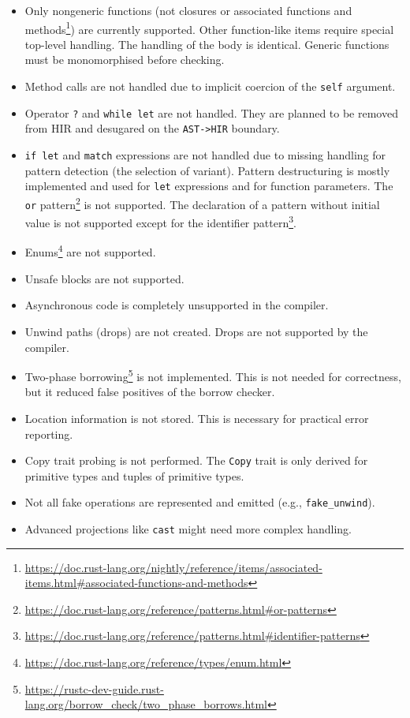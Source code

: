 \documentclass[
  11pt,
  twoside,symmetric]{report}
\providecommand{\tightlist}{%
  \setlength{\itemsep}{0pt}\setlength{\parskip}{0pt}}
\DeclareRobustCommand{\href}[2]{#2\footnote{\url{#1}}}
\begin{document}
\begin{itemize}
\tightlist
\item
  Only nongeneric functions (not closures or
  \href{https://doc.rust-lang.org/nightly/reference/items/associated-items.html\#associated-functions-and-methods}{associated
  functions and methods}) are currently supported. Other function-like
  items require special top-level handling. The handling of the body is
  identical. Generic functions must be monomorphised before checking.
\item
  Method calls are not handled due to implicit coercion of the
  \texttt{self} argument.
\item
  Operator \texttt{?} and \texttt{while\ let} are not handled. They are
  planned to be removed from HIR and desugared on the
  \texttt{AST-\textgreater{}HIR} boundary.
\item
  \texttt{if\ let} and \texttt{match} expressions are not handled due to
  missing handling for pattern detection (the selection of variant).
  Pattern destructuring is mostly implemented and used for \texttt{let}
  expressions and for function parameters. The
  \href{https://doc.rust-lang.org/reference/patterns.html\#or-patterns}{\texttt{or}
  pattern} is not supported. The declaration of a pattern without
  initial value is not supported except for the
  \href{https://doc.rust-lang.org/reference/patterns.html\#identifier-patterns}{identifier
  pattern}.
\item
  \href{https://doc.rust-lang.org/reference/types/enum.html}{Enums} are
  not supported.
\item
  Unsafe blocks are not supported.
\item
  Asynchronous code is completely unsupported in the compiler.
\item
  Unwind paths (drops) are not created. Drops are not supported by the
  compiler.
\item
  \href{https://rustc-dev-guide.rust-lang.org/borrow_check/two_phase_borrows.html}{Two-phase
  borrowing} is not implemented. This is not needed for correctness, but
  it reduced false positives of the borrow checker.
\item
  Location information is not stored. This is necessary for practical
  error reporting.
\item
  Copy trait probing is not performed. The \texttt{Copy} trait is only
  derived for primitive types and tuples of primitive types.
\item
  Not all fake operations are represented and emitted (e.g.,
  \texttt{fake\_unwind}).
\item
  Advanced projections like \texttt{cast} might need more complex
  handling.
\end{itemize}
\end{document}
